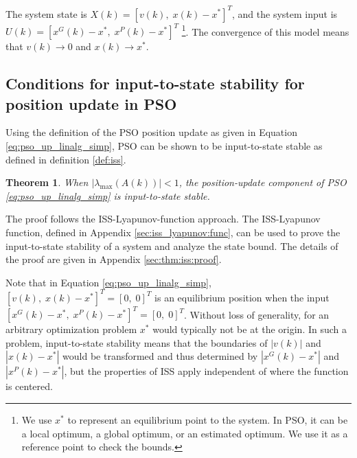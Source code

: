 \documentclass{sig-alternate}
\newtheorem{mythm}{Theorem}
\begin{document}
The system state is $ X(k) = [ v(k), \; x(k) - x^{*} ]^{T} $, and the system input is $ U(k) = [ x^{G}(k) - x^{*} , \;  x^{P}(k) - x^{*} ]^{T} $
\footnote{We use $ x^{*} $ to represent an equilibrium point to the system.
In PSO, it can be a local optimum, a global optimum, or an estimated optimum.
We use it as a reference point to check the bounds.}.
The convergence of this model means that $ v(k) \rightarrow 0 $ and $ x(k) \rightarrow x^{*} $.

\subsection{Conditions for input-to-state stability for position update in PSO}
\label{sec:iss_proof}

Using the definition of the PSO position update as given in Equation \eqref{eq:pso_up_linalg_simp}, PSO can be shown to be input-to-state stable as defined in definition \ref{def:iss}.

\begin{mythm}
\label{thm:iss}
When $ | \lambda_{\max} ( A(k) ) | < 1 $, the position-update component of PSO \eqref{eq:pso_up_linalg_simp} is input-to-state stable. 
\end{mythm}
The proof follows the ISS-Lyapunov-function approach. 
The ISS-Lyapunov function, defined in Appendix \ref{sec:iss_lyapunov:func}, can be used to prove the input-to-state stability of a system and analyze the state bound\cite{Jiang2001857}.
The details of the proof are given in Appendix \ref{sec:thm:iss:proof}.

Note that in Equation \eqref{eq:pso_up_linalg_simp},
$ [ v(k), \; x(k) - x^{*} ]^{T} = [0, \; 0]^{T} $ is an equilibrium position when the input $ [ x^{G}(k) - x^{*} , \; x^{P}(k) - x^{*} ]^{T} = [0,  \; 0]^{T} $.
Without loss of generality, for an arbitrary optimization problem $ x^{*} $ would typically not be at the origin. 
In such a problem, input-to-state stability means that the boundaries of $ | v(k) | $ and $ | x(k) - x^{*} | $ would be transformed and thus determined by $ | x^{G}(k) - x^{*} | $ and $ | x^{P}(k) - x^{*} | $,
but the properties of ISS apply independent of where the function is centered.
\end{document}
